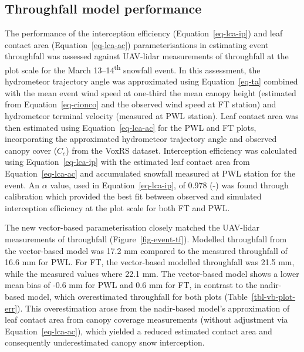 \documentclass[
  letterpaper,
  DIV=11,
  numbers=noendperiod]{scrartcl}
\begin{document}
\subsection{Throughfall model
performance}\label{throughfall-model-performance}

The performance of the interception efficiency
(Equation~\ref{eq-lca-ip}) and leaf contact area
(Equation~\ref{eq-lca-ac}) parameterisations in estimating event
throughfall was assessed against UAV-lidar measurements of throughfall
at the plot scale for the March 13--14\textsuperscript{th} snowfall
event. In this assessment, the hydrometeor trajectory angle was
approximated using Equation~\ref{eq-ta} combined with the mean event
wind speed at one-third the mean canopy height (estimated from
Equation~\ref{eq-cionco} and the observed wind speed at FT station) and
hydrometeor terminal velocity (measured at PWL station). Leaf contact
area was then estimated using Equation~\ref{eq-lca-ac} for the PWL and
FT plots, incorporating the approximated hydrometeor trajectory angle
and observed canopy cover (\(C_c\)) from the VoxRS dataset. Interception
efficiency was calculated using Equation~\ref{eq-lca-ip} with the
estimated leaf contact area from Equation~\ref{eq-lca-ac} and
accumulated snowfall measured at PWL station for the event. An
\(\alpha\) value, used in Equation~\ref{eq-lca-ip}, of 0.978 (-) was
found through calibration which provided the best fit between observed
and simulated interception efficiency at the plot scale for both FT and
PWL.

The new vector-based parameterisation closely matched the UAV-lidar
measurements of throughfall (Figure~\ref{fig-event-tf}). Modelled
throughfall from the vector-based model was 17.2 mm compared to the
measured throughfall of 16.6 mm for PWL. For FT, the vector-based
modelled throughfall was 21.5 mm, while the measured values where 22.1
mm. The vector-based model shows a lower mean bias of -0.6 mm for PWL
and 0.6 mm for FT, in contrast to the nadir-based model, which
overestimated throughfall for both plots (Table~\ref{tbl-vb-plot-err}).
This overestimation arose from the nadir-based model's approximation of
leaf contact area from canopy coverage measurements (without adjustment
via Equation~\ref{eq-lca-ac}), which yielded a reduced estimated contact
area and consequently underestimated canopy snow interception.
\end{document}

